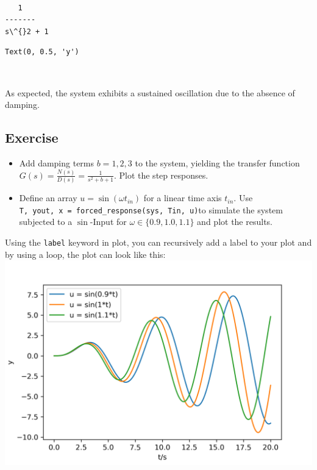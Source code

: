 \documentclass[11pt,a4paper, d]{scrartcl}
\makeatletter
\providecommand{\tightlist}{%
      \setlength{\itemsep}{0pt}\setlength{\parskip}{0pt}}
\newcommand{\boxspacing}{\kern\kvtcb@left@rule\kern\kvtcb@boxsep}
\newcommand{\prompt}[4]{
        {\ttfamily\llap{{\color{#2}[#3]:\hspace{3pt}#4}}\vspace{-\baselineskip}}
    }
\makeatother
\begin{document}
    \begin{Verbatim}[commandchars=\\\{\}]

   1
-------
s\^{}2 + 1

    \end{Verbatim}

            \begin{tcolorbox}[breakable, size=fbox, boxrule=.5pt, pad at break*=1mm, opacityfill=0]
\prompt{Out}{outcolor}{2}{\boxspacing}
\begin{Verbatim}[commandchars=\\\{\}]
Text(0, 0.5, 'y')
\end{Verbatim}
\end{tcolorbox}
        
    \begin{center}
    \end{center}
    { \hspace*{\fill} \\}
    
    As expected, the system exhibits a sustained oscillation due to the
absence of damping.

    \hypertarget{exercise}{%
\subsection{Exercise}\label{exercise}}

\begin{itemize}
\tightlist
\item
  Add damping terms \(b = 1,2,3\) to the system, yielding the transfer
  function \(G(s) = \frac{N(s)}{D(s)} = \frac{1}{s^2+b+1}\). Plot the
  step responses.
\item
  Define an array \(u = \sin(\omega t_{in})\) for a linear time axis
  \(t_{in}\). Use
  \texttt{T,\ yout,\ x\ =\ forced\_response(sys,\ Tin,\ u)}to simulate
  the system subjected to a \(\sin\)-Input for
  \(\omega \in \{0.9, 1.0, 1.1\}\) and plot the results.
\end{itemize}

Using the \texttt{label} keyword in plot, you can recursively add a
label to your plot and by using a loop, the plot can look like this:
\includegraphics{figures/Resonancy.png}
\end{document}
